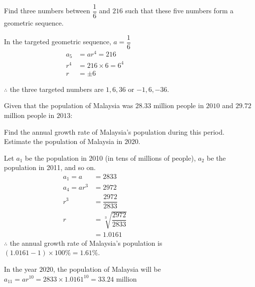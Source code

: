 \documentclass{report}
\begin{document}
        \begin{question}
            Find three numbers between $\dfrac{1}{6}$ and $216$ such that these five numbers form a geometric sequence.

            \sol{}

            \vspace{-1em}
            \noindent In the targeted geometric sequence, $a=\dfrac{1}{6}$
            \vspace{-1em}
            \begin{align*}
                a_5&=a r^4=216 &&&&&&&&&&&& \\
                r^4&=216 \times 6=6^4 \\
                r&= \pm 6
            \end{align*}

            \vspace{-2em}
            \noindent $\therefore$ the three targeted numbers are $1, 6, 36$ or $-1, 6, -36$.
        \end{question}

        \begin{question}
            Given that the population of Malaysia was $28.33$ million people in $2010$ and $29.72$ million people in $2013$:
            \begin{tasks}[label=(\alph*)]
                \task Find the annual growth rate of Malaysia's population during this period.
                \task Estimate the population of Malaysia in $2020$.
            \end{tasks}

            \sol{}
            \begin{tasks}[label=(\alph*)]
                \task Let $a_{1}$ be the population in 2010 (in tens of millions of people), $a_{2}$ be the population in 2011, and so on.
                \begin{align*}
                    a_1=a &= 2833 &&&&&&&&&&&& \\
                    a_4=a r^3 & =2972 \\
                    r^3 & =\dfrac{2972}{2833} \\
                    r & =\sqrt[3]{\dfrac{2972}{2833}} \\
                    & =1.0161
                \end{align*}
                $\therefore$ the annual growth rate of Malaysia's population is $(1.0161-1) \times 100 \% = 1.61 \%$.

                \task In the year $2020$, the population of Malaysia will be $
                a_{11}=a r^{10}=2833 \times 1.0161^{10}=33.24 \text { million }
                $
            \end{tasks}
        \end{question}
\end{document}
